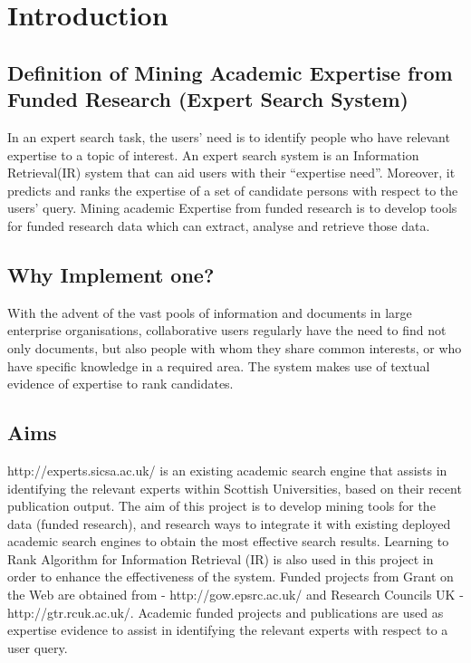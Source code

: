 

\section{Introduction}

\subsection{Definition of Mining Academic Expertise from Funded Research (Expert Search System)}
In an expert search task, the users' need is to identify people who have relevant expertise to a topic of interest.
An expert search system is an Information Retrieval(IR) system that can aid users with their ``expertise need''. 
Moreover, it predicts and ranks the expertise of a set of candidate persons with respect to the users' query.
Mining academic Expertise from funded research is to develop tools for funded research data which can extract, analyse and retrieve those data.

\subsection{Why Implement one?}
With the advent of the vast pools of information and documents in large enterprise organisations, collaborative users regularly have the need to find 
not only documents, but also people with whom they share common interests, or who have specific knowledge in a required area. The system makes use of
textual evidence of expertise to rank candidates.

\subsection{Aims}
http://experts.sicsa.ac.uk/ is an existing academic search engine that assists in identifying the relevant experts within Scottish Universities, 
based on their recent publication output. The aim of this project is to develop mining tools for the data (funded research), 
and research ways to integrate it with existing deployed academic search engines to obtain the most effective search results. 
Learning to Rank Algorithm for Information Retrieval (IR) is also used in this project in order to enhance the effectiveness of the system.
Funded projects from Grant on the Web are obtained from 
- http://gow.epsrc.ac.uk/ and Research Councils UK - http://gtr.rcuk.ac.uk/. Academic funded projects and publications are used as expertise evidence 
to assist in identifying the relevant experts with respect to a user query.

